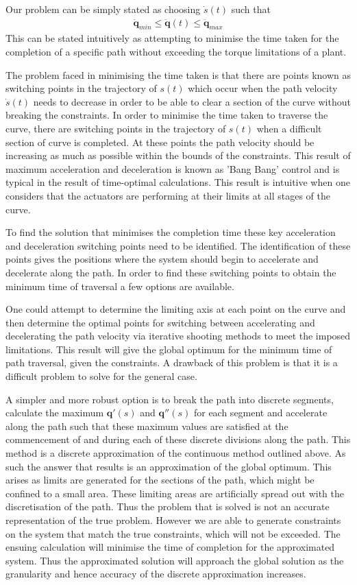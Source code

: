 Our problem can be simply stated as choosing $\dot{s}(t)$ such that 
\begin{align*}
\ddot{\textbf{q}}_{min} \leq \ddot{\textbf{q}}(t) \leq \ddot{\textbf{q}}_{max}
\end{align*} 
This can be stated intuitively as attempting to minimise the time taken for the completion of a specific path without exceeding the torque limitations of a plant.

The problem faced in minimising the time taken is that there are points known as switching points in the trajectory of $s(t)$ which occur when the path velocity $\dot{s}(t)$ needs to decrease in order to be able to clear a section of the curve without breaking the constraints. In order to minimise the time taken to traverse the curve, there are switching points in the trajectory of $s(t)$ when a difficult section of curve is completed. At these points the path velocity should be increasing as much as possible within the bounds of the constraints. This result of maximum acceleration and deceleration is known as 'Bang Bang' control and is typical in the result of time-optimal calculations. This result is intuitive when one considers that the actuators are performing at their limits at all stages of the curve.
 
To find the solution that minimises the completion time these key acceleration and deceleration switching points need to be identified. The identification of these points gives the positions where the system should begin to accelerate and decelerate along the path.
In order to find these switching points to obtain the minimum time of traversal a few options are available.

One could attempt to determine the limiting axis at each point on the curve and then determine the optimal points for switching between accelerating and decelerating the path velocity via iterative shooting methods to meet the imposed limitations. This result will give the global optimum for the minimum time of path traversal, given the constraints. A drawback of this problem is that it is a difficult problem to solve for the general case.

A simpler and more robust option is to break the path into discrete segments, calculate the maximum $\textbf{q}'(s)$ and $\textbf{q}''(s)$ for each segment and accelerate along the path such that these maximum values are satisfied at the commencement of and during each of these discrete divisions along the path. This method is a discrete approximation of the continuous method outlined above. As such the answer that results is an approximation of the global optimum. This arises as limits are generated for the sections of the path, which might be confined to a small area. These limiting areas are artificially spread out with the discretisation of the path. Thus the problem that is solved is not an accurate representation of the true problem. However we are able to generate constraints on the system that match the true constraints, which will not be exceeded. The ensuing calculation will minimise the time of completion for the approximated system. Thus the approximated solution will approach the global solution as the granularity and hence accuracy of the discrete approximation increases.

